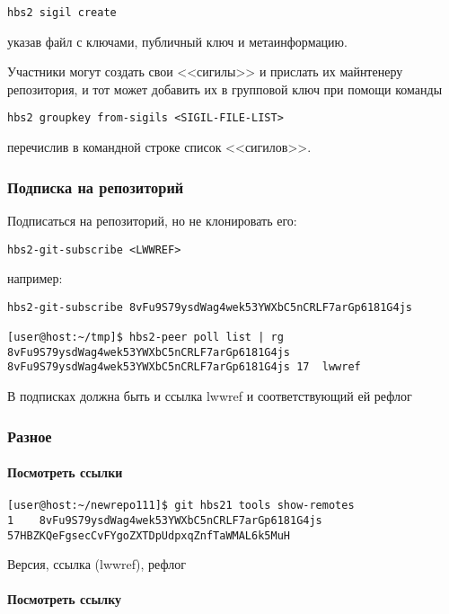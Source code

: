 \documentclass[11pt,a4paper]{article}
\begin{document}
\texttt{hbs2 sigil create}

указав файл с ключами, публичный ключ и метаинформацию.

Участники могут создать свои <<сигилы>> и прислать их майнтенеру репозитория,
и тот может добавить их в групповой ключ при помощи команды

\texttt{hbs2 groupkey from-sigils <SIGIL-FILE-LIST>}

перечислив в командной строке список <<сигилов>>.

\subsubsection{Подписка на репозиторий}

Подписаться на репозиторий, но не клонировать его:

\begin{verbatim}
hbs2-git-subscribe <LWWREF>
\end{verbatim}

например:

\begin{verbatim}
hbs2-git-subscribe 8vFu9S79ysdWag4wek53YWXbC5nCRLF7arGp6181G4js

[user@host:~/tmp]$ hbs2-peer poll list | rg  8vFu9S79ysdWag4wek53YWXbC5nCRLF7arGp6181G4js
8vFu9S79ysdWag4wek53YWXbC5nCRLF7arGp6181G4js 17  lwwref
\end{verbatim}

В подписках должна быть и ссылка lwwref и соответствующий ей рефлог

\subsubsection{Разное}

\paragraph{Посмотреть ссылки}

\begin{verbatim}
[user@host:~/newrepo111]$ git hbs21 tools show-remotes
1    8vFu9S79ysdWag4wek53YWXbC5nCRLF7arGp6181G4js 57HBZKQeFgsecCvFYgoZXTDpUdpxqZnfTaWMAL6k5MuH
\end{verbatim}

Версия, ссылка (lwwref), рефлог

\paragraph{Посмотреть ссылку}
\end{document}
